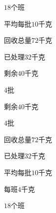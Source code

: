\documentclass[multi=snippet,border={5bp 20bp 5bp 5bp}]{standalone}
\newenvironment{snippet}[3]{\begin{minipage}{#1bp}\color{answerred}\fontsize{#2}{#3}\selectfont\raggedright}{\end{minipage}}
\begin{document}
\begin{snippet}{69.54999999999998}{8.5}{12.8}\SourceSans\setlength{\mathindent}{2bp}\(18\)个班\end{snippet}
\begin{snippet}{68.79999999999995}{8.5}{12.8}\SourceSans\setlength{\mathindent}{2bp}平均每批\(10\)千克\end{snippet}
\begin{snippet}{69.80000000000001}{8.5}{12.8}\SourceSans\setlength{\mathindent}{2bp}回收总量\(72\)千克\end{snippet}
\begin{snippet}{69.04999999999998}{8.5}{12.8}\SourceSans\setlength{\mathindent}{2bp}已处理\(32\)千克\end{snippet}
\begin{snippet}{72.54999999999995}{8.5}{12.8}\SourceSans\setlength{\mathindent}{2bp}剩余\(40\)千克\end{snippet}
\begin{snippet}{69.04999999999995}{8.5}{12.8}\SourceSans\setlength{\mathindent}{2bp}\(4\)批\end{snippet}
\begin{snippet}{77.05000000000001}{8.5}{12.8}\SourceSans\setlength{\mathindent}{2bp}剩余\(40\)千克\end{snippet}
\begin{snippet}{69.29999999999998}{8.5}{12.8}\SourceSans\setlength{\mathindent}{2bp}\(4\)批\end{snippet}
\begin{snippet}{72.29999999999995}{8.5}{12.8}\SourceSans\setlength{\mathindent}{2bp}回收总量\(72\)千克\end{snippet}
\begin{snippet}{69.29999999999995}{8.5}{12.8}\SourceSans\setlength{\mathindent}{2bp}已处理\(32\)千克\end{snippet}
\begin{snippet}{69.54999999999998}{8.5}{12.8}\SourceSans\setlength{\mathindent}{2bp}平均每批\(10\)千克\end{snippet}
\begin{snippet}{72.79999999999995}{8.5}{12.8}\SourceSans\setlength{\mathindent}{2bp}每班\(4\)千克\end{snippet}
\begin{snippet}{69.04999999999995}{8.5}{12.8}\SourceSans\setlength{\mathindent}{2bp}\(18\)个班\end{snippet}
\end{document}

